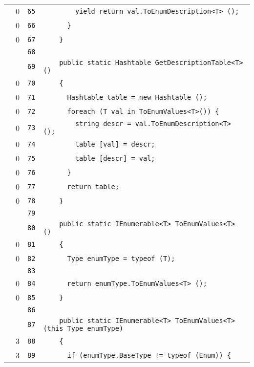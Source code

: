\documentclass[a4paper,10pt]{article}
\begin{document}
\begin{longtable}[l]{lrrl}
\cellcolor{red} & 0 & \verb~65~ & \verb~        yield return val.ToEnumDescription<T> ();~\\
\cellcolor{red} & 0 & \verb~66~ & \verb~      }~\\
\cellcolor{red} & 0 & \verb~67~ & \verb~    }~\\
\cellcolor{gray} &  & \verb~68~ & \verb~~\\
\cellcolor{gray} &  & \verb~69~ & \verb~    public static Hashtable GetDescriptionTable<T> ()~\\
\cellcolor{red} & 0 & \verb~70~ & \verb~    {~\\
\cellcolor{red} & 0 & \verb~71~ & \verb~      Hashtable table = new Hashtable ();~\\
\cellcolor{red} & 0 & \verb~72~ & \verb~      foreach (T val in ToEnumValues<T>()) {~\\
\cellcolor{red} & 0 & \verb~73~ & \verb~        string descr = val.ToEnumDescription<T> ();~\\
\cellcolor{red} & 0 & \verb~74~ & \verb~        table [val] = descr;~\\
\cellcolor{red} & 0 & \verb~75~ & \verb~        table [descr] = val;~\\
\cellcolor{red} & 0 & \verb~76~ & \verb~      }~\\
\cellcolor{red} & 0 & \verb~77~ & \verb~      return table;~\\
\cellcolor{red} & 0 & \verb~78~ & \verb~    }~\\
\cellcolor{gray} &  & \verb~79~ & \verb~~\\
\cellcolor{gray} &  & \verb~80~ & \verb~    public static IEnumerable<T> ToEnumValues<T> ()~\\
\cellcolor{red} & 0 & \verb~81~ & \verb~    {~\\
\cellcolor{red} & 0 & \verb~82~ & \verb~      Type enumType = typeof (T);~\\
\cellcolor{gray} &  & \verb~83~ & \verb~~\\
\cellcolor{red} & 0 & \verb~84~ & \verb~      return enumType.ToEnumValues<T> ();~\\
\cellcolor{red} & 0 & \verb~85~ & \verb~    }~\\
\cellcolor{gray} &  & \verb~86~ & \verb~~\\
\cellcolor{gray} &  & \verb~87~ & \verb~    public static IEnumerable<T> ToEnumValues<T> (this Type enumType)~\\
\cellcolor{green} & 3 & \verb~88~ & \verb~    {~\\
\cellcolor{green} & 3 & \verb~89~ & \verb~      if (enumType.BaseType != typeof (Enum)) {~\\

\end{longtable}
\end{document}
